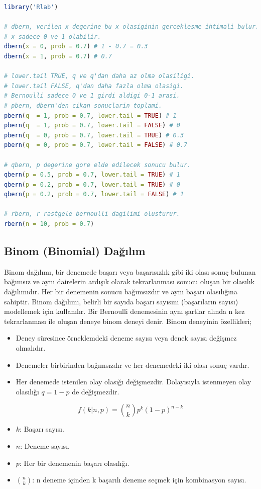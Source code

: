 \begin{lstlisting}[language=R]
library('Rlab')

# dbern, verilen x degerine bu x olasiginin gerceklesme ihtimali bulur.
# x sadece 0 ve 1 olabilir.
dbern(x = 0, prob = 0.7) # 1 - 0.7 = 0.3
dbern(x = 1, prob = 0.7) # 0.7

# lower.tail TRUE, q ve q'dan daha az olma olasiligi.
# lower.tail FALSE, q'dan daha fazla olma olasigi.
# Bernoulli sadece 0 ve 1 girdi aldigi 0-1 arasi.
# pbern, dbern'den cikan sonuclarin toplami.
pbern(q  = 1, prob = 0.7, lower.tail = TRUE) # 1
pbern(q  = 1, prob = 0.7, lower.tail = FALSE) # 0
pbern(q  = 0, prob = 0.7, lower.tail = TRUE) # 0.3
pbern(q  = 0, prob = 0.7, lower.tail = FALSE) # 0.7

# qbern, p degerine gore elde edilecek sonucu bulur.
qbern(p = 0.5, prob = 0.7, lower.tail = TRUE) # 1
qbern(p = 0.2, prob = 0.7, lower.tail = TRUE) # 0
qbern(p = 0.2, prob = 0.7, lower.tail = FALSE) # 1

# rbern, r rastgele bernoulli dagilimi olusturur.
rbern(n = 10, prob = 0.7)
\end{lstlisting}

\newpage

\subsection{Binom (Binomial) Dağılım}
Binom dağılımı, bir denemede başarı veya başarısızlık gibi iki olası sonuç bulunan bağımsız ve aynı dairelerin ardışık olarak tekrarlanması sonucu oluşan bir olasılık dağılımıdır. Her bir denemenin sonucu bağımsızdır ve aynı başarı olasılığına sahiptir. Binom dağılımı, belirli bir sayıda başarı sayısını (başarıların sayısı) modellemek için kullanılır. Bir Bernoulli denemesinin aynı şartlar alında n kez tekrarlanması ile oluşan deneye binom deneyi denir. Binom deneyinin özellikleri;
\begin{itemize}
	\item Deney süresince örneklemdeki deneme sayısı veya denek sayısı değişmez olmalıdır.
	\item Denemeler birbirinden bağımsızdır ve her denemedeki iki olası sonuç vardır.
	\item Her denemede istenilen olay olasığı değişmezdir. Dolayısıyla istenmeyen olay olasılığı $q = 1 - p$ de değişmezdir.
\end{itemize}

\[f(k|n,p) = \binom{n}{k} p^k (1-p)^{n-k}\]
\begin{itemize}
	\item $k$: Başarı sayısı.
	\item $n$: Deneme sayısı.
	\item $p$: Her bir denemenin başarı olasılığı.
	\item $\binom{n}{k}$: n deneme içinden k başarılı deneme seçmek için kombinasyon sayısı.
\end{itemize}

